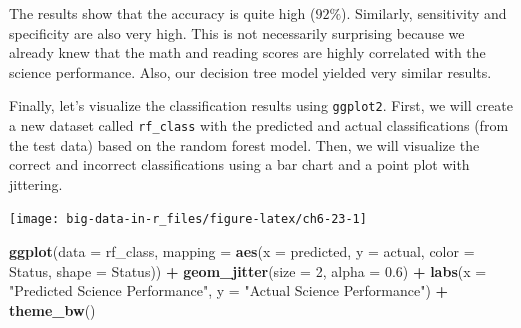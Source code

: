 \documentclass[]{book}
\newenvironment{Shaded}{\begin{snugshade}}{\end{snugshade}}
\newcommand{\DataTypeTok}[1]{\textcolor[rgb]{0.13,0.29,0.53}{#1}}
\newcommand{\DecValTok}[1]{\textcolor[rgb]{0.00,0.00,0.81}{#1}}
\newcommand{\FloatTok}[1]{\textcolor[rgb]{0.00,0.00,0.81}{#1}}
\newcommand{\KeywordTok}[1]{\textcolor[rgb]{0.13,0.29,0.53}{\textbf{#1}}}
\newcommand{\NormalTok}[1]{#1}
\newcommand{\OperatorTok}[1]{\textcolor[rgb]{0.81,0.36,0.00}{\textbf{#1}}}
\newcommand{\OtherTok}[1]{\textcolor[rgb]{0.56,0.35,0.01}{#1}}
\newcommand{\StringTok}[1]{\textcolor[rgb]{0.31,0.60,0.02}{#1}}
\begin{document}
The results show that the accuracy is quite high (\(92\%\)). Similarly, sensitivity and specificity are also very high. This is not necessarily surprising because we already knew that the math and reading scores are highly correlated with the science performance. Also, our decision tree model yielded very similar results.

Finally, let's visualize the classification results using \texttt{ggplot2}. First, we will create a new dataset called \texttt{rf\_class} with the predicted and actual classifications (from the test data) based on the random forest model. Then, we will visualize the correct and incorrect classifications using a bar chart and a point plot with jittering.

\begin{Shaded}
\end{Shaded}

\texttt{[image: big-data-in-r\_files/figure-latex/ch6-23-1]}

\begin{Shaded}
\begin{Highlighting}[]
\KeywordTok{ggplot}\NormalTok{(}\DataTypeTok{data =}\NormalTok{ rf_class, }
       \DataTypeTok{mapping =} \KeywordTok{aes}\NormalTok{(}\DataTypeTok{x =}\NormalTok{ predicted, }\DataTypeTok{y =}\NormalTok{ actual, }
                     \DataTypeTok{color =}\NormalTok{ Status, }\DataTypeTok{shape =}\NormalTok{ Status)) }\OperatorTok{+}
\StringTok{  }\KeywordTok{geom_jitter}\NormalTok{(}\DataTypeTok{size =} \DecValTok{2}\NormalTok{, }\DataTypeTok{alpha =} \FloatTok{0.6}\NormalTok{) }\OperatorTok{+}
\StringTok{  }\KeywordTok{labs}\NormalTok{(}\DataTypeTok{x =} \StringTok{"Predicted Science Performance"}\NormalTok{,}
       \DataTypeTok{y =} \StringTok{"Actual Science Performance"}\NormalTok{) }\OperatorTok{+}
\StringTok{  }\KeywordTok{theme_bw}\NormalTok{()}
\end{Highlighting}
\end{Shaded}
\end{document}
